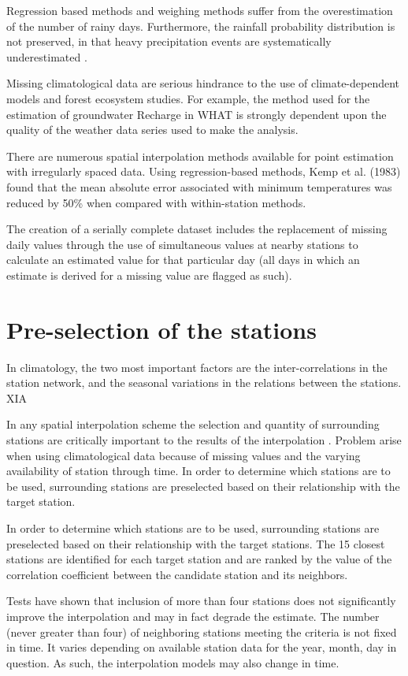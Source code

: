 \documentclass[WHATMANUAL.tex]{subfiles}
\begin{document}
Regression based methods and weighing methods suffer from the overestimation of the number of rainy days. Furthermore, the rainfall probability distribution is not preserved, in that heavy precipitation events are systematically underestimated \citep{simolo_improving_2010}.

Missing climatological data are serious hindrance to the use of climate-dependent models and forest ecosystem studies. For example, the method used for the estimation of groundwater Recharge in WHAT is strongly dependent upon the quality of the weather data series used to make the analysis.

There are numerous spatial interpolation methods available for point estimation with irregularly spaced data. Using regression-based methods, Kemp et al. (1983) found that the mean absolute error associated with minimum temperatures was reduced by 50\% when compared with within-station methods. 

The creation of a serially complete dataset includes the replacement of missing daily values through the use of simultaneous values at nearby stations to calculate an estimated value for that particular day (all days in which an estimate is derived for a missing value are flagged as such).

\section{Pre-selection of the stations}
In climatology, the two most important factors are the inter-correlations in the station network, and the seasonal variations in the relations between the stations. {XIA}

In any spatial interpolation scheme the selection and quantity of surrounding stations are critically important to the results of the interpolation \citep{eischeid_quality_1995}. Problem arise when using climatological data because of missing values and the varying availability of station through time. In order to determine which stations are to be used, surrounding stations are preselected based on their relationship with the target station.

In order to determine which stations are to be used, surrounding stations are preselected based on their relationship with the target stations. The 15 closest stations are identified for each target station and are ranked by the value of the correlation coefficient between the candidate station  and its neighbors.

Tests have shown that inclusion of more than four stations does not significantly improve the interpolation and may in fact degrade the estimate. The number (never greater than four) of neighboring stations meeting the criteria is not fixed in time. It varies depending on available station data for the year, month, day in question. As such, the interpolation models may also change in time.
\end{document}
